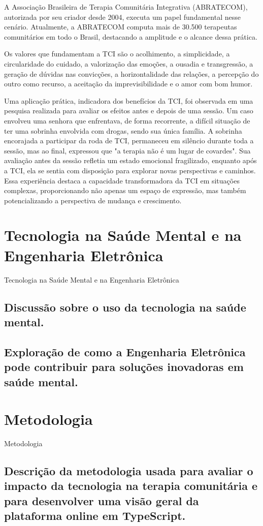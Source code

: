 A Associação Brasileira de Terapia Comunitária Integrativa (ABRATECOM), autorizada por seu criador desde 2004, executa um papel fundamental nesse cenário. Atualmente, a ABRATECOM computa mais de 30.500 terapeutas comunitários em todo o Brasil, destacando a amplitude e o alcance dessa prática.\cite{SILVAFRANCO}

Os valores que fundamentam a TCI são o acolhimento, a simplicidade, a circularidade do cuidado, a valorização das emoções, a ousadia e transgressão, a geração de dúvidas nas convicções, a horizontalidade das relações, a percepção do outro como recurso, a aceitação da imprevisibilidade e o amor com bom humor.\cite{SILVA}

Uma aplicação prática, indicadora dos benefícios da TCI, foi observada em uma pesquisa realizada para avaliar os efeitos antes e depois de uma sessão. Um caso envolveu uma senhora que enfrentava, de forma recorrente, a difícil situação de ter uma sobrinha envolvida com drogas, sendo sua única família. A sobrinha encorajada a participar da roda de TCI, permaneceu em silêncio durante toda a sessão, mas ao final, expressou que "a terapia não é um lugar de covardes". Sua avaliação antes da sessão refletia um estado emocional fragilizado, enquanto após a TCI, ela se sentia com disposição para explorar novas perspectivas e caminhos. Essa experiência destaca a capacidade transformadora da TCI em situações complexas, proporcionando não apenas um espaço de expressão, mas também potencializando a perspectiva de mudança e crescimento. \cite{LEITEePALOS}

\chapter{Tecnologia na Saúde Mental e na Engenharia Eletrônica}{Tecnologia na Saúde Mental e na Engenharia Eletrônica}
\section{Discussão sobre o uso da tecnologia na saúde mental.}
\section{Exploração de como a Engenharia Eletrônica pode contribuir para soluções inovadoras em saúde mental.}
\chapter{Metodologia}{Metodologia}
\section{Descrição da metodologia usada para avaliar o impacto da tecnologia na terapia comunitária e para desenvolver uma visão geral da plataforma online em TypeScript.}
